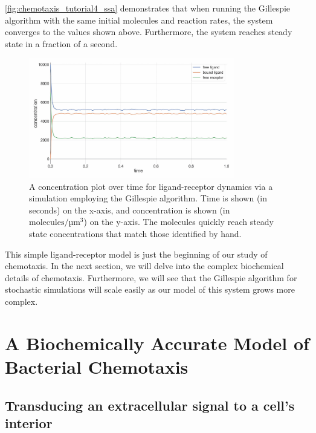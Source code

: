 \autoref{fig:chemotaxis_tutorial4_ssa} demonstrates that when running the Gillespie algorithm with the same initial molecules and reaction rates, the system converges to the values shown above. Furthermore, the system reaches steady state in a fraction of a second.\\

\begin{figure}[h]
\centering
\mySfFamily
\includegraphics[width = 0.8\textwidth]{../images_CMYK/chemotaxis_tutorial4_ssa_vscode}
\caption{A concentration plot over time for ligand-receptor dynamics via a simulation employing the Gillespie algorithm. Time is shown (in seconds) on the x-axis, and concentration is shown (in $\text{molecules}/\text{µm}^\text{3}$) on the y-axis. The molecules quickly reach steady state concentrations that match those identified by hand.}
\label{fig:chemotaxis_tutorial4_ssa}
\end{figure}

This simple ligand-receptor model is just the beginning of our study of chemotaxis. In the next section, we will delve into the complex biochemical details of chemotaxis. Furthermore, we will see that the Gillespie algorithm for stochastic simulations will scale easily as our model of this system grows more complex.\\

\FloatBarrier
{}

\section{A Biochemically Accurate Model of Bacterial Chemotaxis}
\label{sec:a_biochemically_accurate_model_of_bacterial_chemotaxis}

\subsection{Transducing an extracellular signal to a cell's interior}


